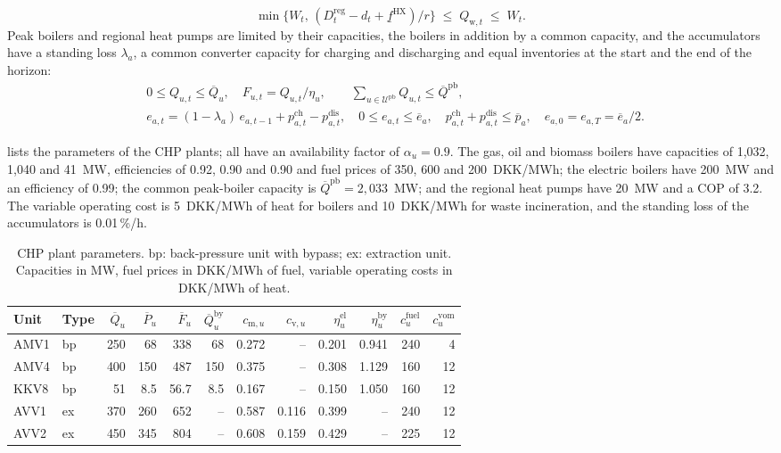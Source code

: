 \begin{equation}
\min\big\{W_t,\,(D^{\mathrm{reg}}_t-d_t+\underline f^{\mathrm{HX}})/r\big\} \;\le\; Q_{\mathrm{w},t} \;\le\; W_t. \label{eq:waste}
\end{equation}
Peak boilers and regional heat pumps are limited by their capacities, the boilers in addition by a common capacity, and the accumulators have a standing loss $\lambda_a$, a common converter capacity for charging and discharging and equal inventories at the start and the end of the horizon:
\begin{align}
& 0\le Q_{u,t}\le \overline Q_u, \quad F_{u,t} = Q_{u,t}/\eta_u, \qquad \textstyle\sum_{u\in\mathcal U^{\mathrm{pb}}} Q_{u,t} \le \overline Q^{\mathrm{pb}}, \label{eq:boilers}\\
& e_{a,t} = (1-\lambda_a)\,e_{a,t-1} + p^{\mathrm{ch}}_{a,t} - p^{\mathrm{dis}}_{a,t}, \quad 0\le e_{a,t}\le \overline e_a, \quad p^{\mathrm{ch}}_{a,t}+p^{\mathrm{dis}}_{a,t}\le \overline p_a, \quad e_{a,0}=e_{a,T}=\overline e_a/2. \label{eq:upstream-limits}
\end{align}

 lists the parameters of the CHP plants; all have an availability factor of $\alpha_u=0.9$. The gas, oil and biomass boilers have capacities of 1,032, 1,040 and 41~MW, efficiencies of 0.92, 0.90 and 0.90 and fuel prices of 350, 600 and 200~DKK/MWh; the electric boilers have 200~MW and an efficiency of 0.99; the common peak-boiler capacity is $\overline Q^{\mathrm{pb}}=2{,}033$~MW; and the regional heat pumps have 20~MW and a COP of 3.2. The variable operating cost is 5~DKK/MWh of heat for boilers and 10~DKK/MWh for waste incineration, and the standing loss of the accumulators is 0.01\,\%/h.

\begin{table}[!htb]
    \centering
    \small
    \caption{CHP plant parameters. bp: back-pressure unit with bypass; ex: extraction unit. Capacities in MW, fuel prices in DKK/MWh of fuel, variable operating costs in DKK/MWh of heat.}
    \label{tab:units}
    \begin{tabular}{llrrrrrrrrrr}
        \toprule
        Unit & Type & $\overline Q_u$ & $\overline P_u$ & $\overline F_u$ & $\overline Q^{\mathrm{by}}_u$ & $c_{\mathrm{m},u}$ & $c_{\mathrm{v},u}$ & $\eta^{\mathrm{el}}_u$ & $\eta^{\mathrm{by}}_u$ & $c^{\mathrm{fuel}}_u$ & $c^{\mathrm{vom}}_u$ \\
        \midrule
        AMV1 & bp & 250 & 68 & 338 & 68 & 0.272 & -- & 0.201 & 0.941 & 240 & 4 \\
        AMV4 & bp & 400 & 150 & 487 & 150 & 0.375 & -- & 0.308 & 1.129 & 160 & 12 \\
        KKV8 & bp & 51 & 8.5 & 56.7 & 8.5 & 0.167 & -- & 0.150 & 1.050 & 160 & 12 \\
        AVV1 & ex & 370 & 260 & 652 & -- & 0.587 & 0.116 & 0.399 & -- & 240 & 12 \\
        AVV2 & ex & 450 & 345 & 804 & -- & 0.608 & 0.159 & 0.429 & -- & 225 & 12 \\
        \bottomrule
    \end{tabular}
\end{table}
